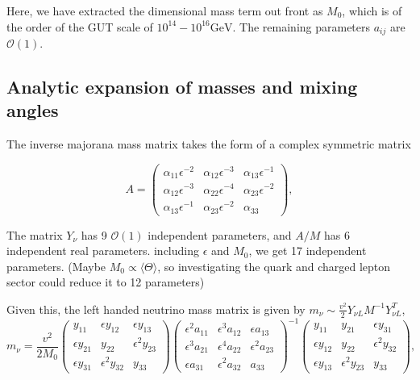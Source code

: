 Here, we have extracted the dimensional mass term out front as $M_0$, which is of the order of the GUT scale of $10^{14} - 10^{16} \text{GeV}$. The remaining parameters $a_{ij}$ are $\mathcal{O}(1)$.

\subsection{Analytic expansion of masses and mixing angles}
The inverse majorana mass matrix takes the form of a complex symmetric matrix 

\begin{equation}
    A = \begin{pmatrix}
        \alpha_{11}\epsilon^{-2} & \alpha_{12}\epsilon^{-3}  & \alpha_{13}\epsilon^{-1} \\
        \alpha_{12}\epsilon^{-3} & \alpha_{22}\epsilon^{-4}  & \alpha_{23}\epsilon^{-2} \\
        \alpha_{13}\epsilon^{-1} & \alpha_{23} \epsilon^{-2} & \alpha_{33} 
    \end{pmatrix}, 
\end{equation}


The matrix $Y_\nu$ has 9 $\mathcal{O}(1)$ independent parameters, and $A/M$ has 6 independent real parameters. including $\epsilon$ and $M_0$, we get 17 independent parameters. (Maybe $M_0 \propto \langle\Theta\rangle$, so investigating the quark and charged lepton sector could reduce it to 12 parameters)

Given this, the left handed neutrino mass matrix is given by $m_\nu \sim \frac{v^2}{2} Y_{\nu L} M^{-1} Y_{\nu L}^T$,
\begin{equation}
    m_\nu = \frac{v^2}{2M_0} \begin{pmatrix}
        y_{11} &\epsilon y_{12} & \epsilon y_{13} \\
        \epsilon y_{21}&y_{22}&\epsilon^{2}y_{23}\\
        \epsilon y_{31}& \epsilon^{2}y_{32}&y_{33}
    \end{pmatrix}
    \begin{pmatrix}
    \epsilon^{2}a_{11}&\epsilon^{3}a_{12}&\epsilon a_{13}\\
    
    \epsilon^{3} a_{21} & \epsilon^{4} a_{22}& \epsilon^{2} a_{23}\\
    
    \epsilon a_{31} & \epsilon^{2}a_{32}&a_{33} 
    \end{pmatrix}^{-1}
    \begin{pmatrix}
        y_{11} & y_{21}& \epsilon y_{31} \\
        \epsilon  y_{12}&y_{22}&\epsilon^{2}y_{32}\\
        \epsilon y_{13}& \epsilon^{2}y_{23}&y_{33}
    \end{pmatrix},
\end{equation}

